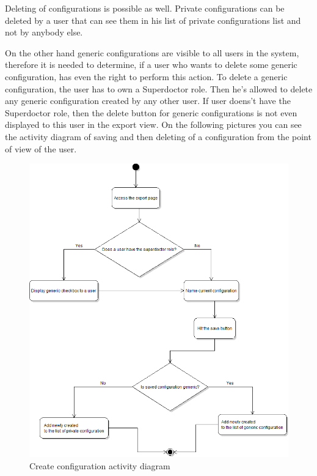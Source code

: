 \documentclass[thesis=B,english]{FITthesis}[2012/10/20]
\begin{document}
Deleting of configurations is possible as well. Private configurations can be deleted by a user that can see them in his list of private configurations list and not by anybody else. 

On the other hand generic configurations are visible to all users in the system, therefore it is needed to determine, if a user who wants to delete some generic configuration, has even the right to perform this action. To delete a generic configuration, the user has to own a Superdoctor role. Then he's allowed to delete any generic configuration created by any other user. If user doens't have the Superdoctor role, then the delete button for generic configurations is not even displayed to this user in the export view.
On the following pictures you can see the activity diagram of saving and then deleting of a configuration from the point of view of the user.
\begin{figure}[ht]\centering
\includegraphics[width=0.7\paperwidth]{createConfigurationDiagram}
		\caption{Create configuration activity diagram}
\end{figure}
\end{document}
